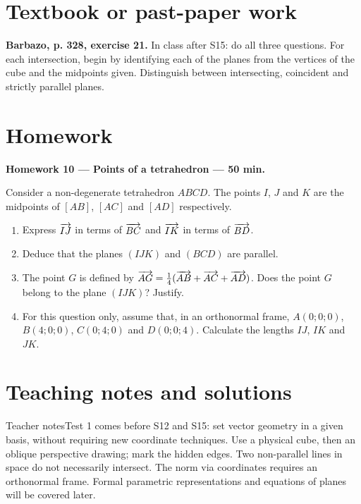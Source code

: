 \section{Textbook or past-paper work}\textbf{Barbazo, p. 328, exercise 21.} In class after S15: do all three questions. For each intersection, begin by identifying each of the planes from the vertices of the cube and the midpoints given. Distinguish between intersecting, coincident and strictly parallel planes.

\section{Homework}\textbf{Homework 10 --- Points of a tetrahedron --- 50 min.}\par Consider a non-degenerate tetrahedron $ABCD$. The points $I$, $J$ and $K$ are the midpoints of $[AB]$, $[AC]$ and $[AD]$ respectively.
\begin{enumerate}\item Express $\overrightarrow{IJ}$ in terms of $\overrightarrow{BC}$ and $\overrightarrow{IK}$ in terms of $\overrightarrow{BD}$.
\item Deduce that the planes $(IJK)$ and $(BCD)$ are parallel.
\item The point $G$ is defined by $\overrightarrow{AG}=\frac14(\overrightarrow{AB}+\overrightarrow{AC}+\overrightarrow{AD})$. Does the point $G$ belong to the plane $(IJK)$? Justify.
\item For this question only, assume that, in an orthonormal frame, $A(0;0;0)$, $B(4;0;0)$, $C(0;4;0)$ and $D(0;0;4)$. Calculate the lengths $IJ$, $IK$ and $JK$.\end{enumerate}

\ifprof\clearpage\section{Teaching notes and solutions}\begin{profbox}{Teacher notes}Test 1 comes before S12 and S15: set vector geometry in a given basis, without requiring new coordinate techniques. Use a physical cube, then an oblique perspective drawing; mark the hidden edges. Two non-parallel lines in space do not necessarily intersect. The norm via coordinates requires an orthonormal frame. Formal parametric representations and equations of planes will be covered later.\end{profbox}

